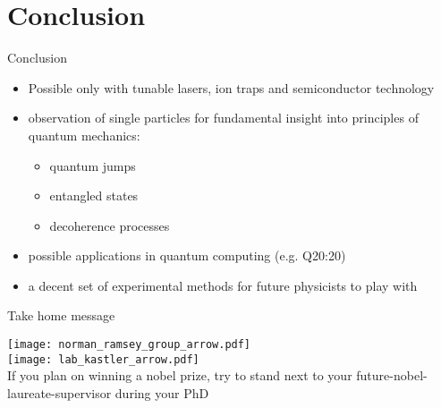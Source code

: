 \section{Conclusion}

\begin{frame}[t]{Conclusion}
  \begin{itemize}
    \item<1-> Possible only with tunable lasers, ion traps and semiconductor
      technology
    \item<2-> observation of single particles for fundamental insight into
      principles of quantum mechanics:
      \begin{itemize}
        \item quantum jumps
        \item entangled states
        \item decoherence processes
      \end{itemize}
    \item<3-> possible applications in quantum computing (e.g. Q20:20)
    \item<4> a decent set of experimental methods for future physicists to play
      with
  \end{itemize}
\end{frame}

\begin{frame}[t]{Take home message}
  \begin{center}
    \texttt{[image: norman\_ramsey\_group\_arrow.pdf]}\\
    \texttt{[image: lab\_kastler\_arrow.pdf]}\\
    \vspace{0.1cm}
    If you plan on winning a nobel prize, try to stand next to your
    future-nobel-laureate-supervisor during your PhD
  \end{center}

\end{frame}
